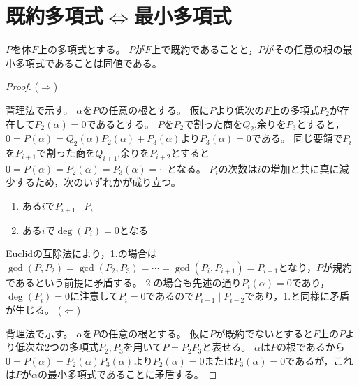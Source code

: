     \section{既約多項式\texorpdfstring{$\iff$}{⇔}最小多項式}
        \begin{shadebox}
            $P$を体$F$上の多項式とする。
            $P$が$F$上で既約であることと，$P$がその任意の根の最小多項式であることは同値である。
        \end{shadebox}
        \begin{proof}
            ($\Rightarrow$)
            \par
            背理法で示す。
            $\alpha$を$P$の任意の根とする。
            仮に$P$より低次の$F$上の多項式$P_2$が存在して$P_2(\alpha)=0$であるとする。
            $P$を$P_2$で割った商を$Q_2$,余りを$P_3$とすると，$0 = P(\alpha) = Q_2(\alpha)P_2(\alpha) + P_3(\alpha)$より$P_3(\alpha) = 0$である。
            同じ要領で$P_i$を$P_{i+1}$で割った商を$Q_{i+1}$,余りを$P_{i+2}$とすると$0 = P(\alpha) = P_2(\alpha) = P_3(\alpha) = \dotsb$となる。
            $P_i$の次数は$i$の増加と共に真に減少するため，次のいずれかが成り立つ。
            \begin{enumerate}
                \item ある$i$で$P_{i+1} \mid P_i$
                \item ある$i$で$\deg(P_i)=0$となる
            \end{enumerate}
            Euclidの互除法により，1.の場合は$\gcd(P,P_2) = \gcd(P_2,P_3) = \dotsb = \gcd(P_i,P_{i+1}) = P_{i+1}$となり，$P$が規約であるという前提に矛盾する。
            2.の場合も先述の通り$P_i(\alpha)=0$であり，$\deg(P_i)=0$に注意して$P_i=0$であるので$P_{i-1} \mid P_{i-2}$であり，1.と同様に矛盾が生じる。
            \newline\newline
            ($\Leftarrow$)
            \par
            背理法で示す。
            $\alpha$を$P$の任意の根とする。
            仮に$P$が既約でないとすると$F$上の$P$より低次な2つの多項式$P_2,P_3$を用いて$P=P_2P_3$と表せる。
            $\alpha$は$P$の根であるから$0 = P(\alpha) = P_2(\alpha)P_3(\alpha)$より$P_2(\alpha) = 0$または$P_3(\alpha) = 0$であるが，これは$P$が$\alpha$の最小多項式であることに矛盾する。
        \end{proof}